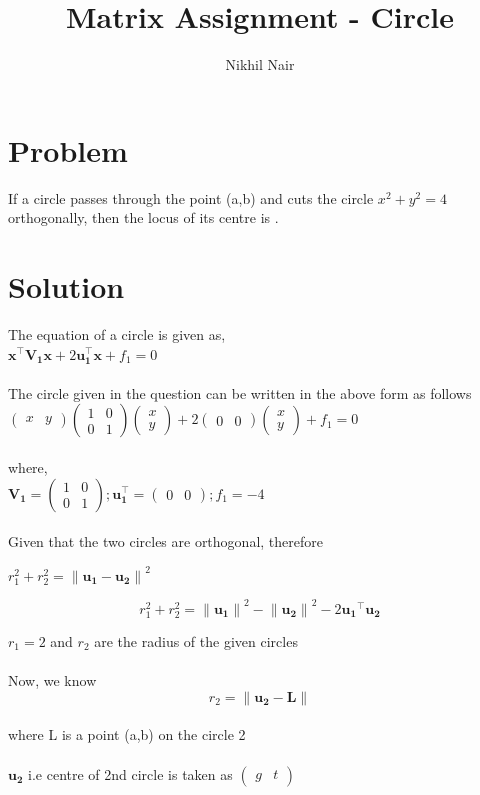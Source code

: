 \documentclass[journal,12pt,twocolumn]{IEEEtran}
\title{\mytitle}
\title{
Matrix Assignment - Circle
}
\author{Nikhil Nair}
\newcommand{\myvec}[1]{\ensuremath{\begin{pmatrix}#1\end{pmatrix}}}
\let\vec\mathbf
\begin{document}
\maketitle
\tableofcontents
\bigskip


\section{\textbf{Problem}}
If  a circle passes through the point (a,b) and cuts the circle $x^2+y^2=4$ orthogonally, then the locus of its centre is .\\


\section{\textbf{Solution}}
The equation of a circle is given as,   \\

${\vec{x^{\top}V_1 x} + 2\vec{u_1^{\top}x}} + f_1=0$
\\
\\
The circle given in the question can be written in the above form as follows
\\

$\myvec{x & y}\myvec{1&0\\ 0&1}\myvec{x\\y} + 2\myvec{0&0}\myvec{x\\y} + f_1 = 0$\\
\\
where,
\\

$\vec{V_1}=\myvec{1&0\\ 0&1} ; \vec{u_1^{\top}}=\myvec{0&0} ; f_1=-4$
\\
\\

Given that the two circles are orthogonal, therefore
\\
\begin{center}
$r_1^2 + r_2^2 = {\lVert \vec{u_1} - \vec{u_2} \rVert}^2$
\end{center}

\begin{equation}
r_1^2 + r_2^2 = {\lVert \vec{u_1} \rVert}^2 -{\lVert \vec{u_2} \rVert}^2 -2 \vec{ u_1}^{\top}\vec{u_2} \label{eq-1}
\end{equation}

\vspace*{1cm}
$r_1=2$ and $r_2$ are the radius of the given circles 
\\
\\
Now, we know
\begin{equation}
r_2=\lVert{ \vec{u_2} - \vec{L}}\rVert
\end{equation}             \label{eq-2}
\\
where L is a point (a,b) on the circle 2
\\
\\
$\vec{u_2}$ i.e centre of 2nd circle is taken as $\myvec{g&t}$
\end{document}
